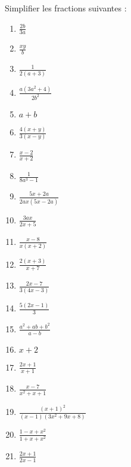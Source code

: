 \begin{solution}
Simplifier les fractions suivantes :
\begin{multicols}{3}
\begin{enumerate}
\item $\frac{2b}{3a}$
\item $\frac{xy}{b}$
\item $\frac{1}{2(a+3)}$
\item $\frac{a(3{{a}^{2}}+4)}{2{{b}^{2}}}$
\item $a+b$
\item $\frac{4(x+y)}{3(x-y)}$
\item $\frac{x-2}{x+2}$
\item $\frac{1}{8{{a}^{3}}-1}$
\item $\frac{5x+2a}{2ax(5x-2a)}$
\item $\frac{3ax}{2x+5}$
\item $\frac{x-8}{x(x+2)}$
\item $\frac{2(x+3)}{x+7}$
\item $\frac{2x-7}{3(4x-3)}$
\item $\frac{5(2x-1)}{3}$
\item $\frac{{{a}^{2}}+ab+{{b}^{2}}}{a-b}$
\item $x+2$
\item $\frac{2x+1}{x+1}$
\item $\frac{x-7}{{{x}^{2}}+x+1}$
\item $\frac{{{(x+1)}^{2}}}{(x-1)(3{{x}^{2}}+9x+8)}$
\item $\frac{1-x+{{x}^{2}}}{1+x+{{x}^{2}}}$
\item $\frac{2x+1}{2x-1}$
\end{enumerate}
\end{multicols}
\end{solution}


